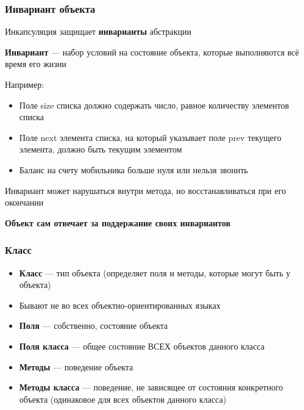 \documentclass[xetex,mathserif,serif]{beamer}
\begin{document}
	\begin{frame}
		\frametitle{Инвариант объекта}
		Инкапсуляция защищает \textbf{инварианты} абстракции
		
		\textbf{Инвариант} --- набор условий на состояние объекта, которые выполняются всё время его жизни

		Например:
		\begin{itemize}
			\item Поле size списка должно содержать число, равное количеству элементов списка
			\item Поле next элемента списка, на который указывает поле prev текущего элемента, должно быть текущим элементом
			\item Баланс на счету мобильника больше нуля или нельзя звонить
		\end{itemize}

		Инвариант может нарушаться внутри метода, но восстанавливаться при его окончании

		\textbf{Объект сам отвечает за поддержание своих инвариантов}
	\end{frame}

	\begin{frame}
		\frametitle{Класс}
		\begin{itemize}
			\item \textbf{Класс} --- тип объекта (определяет поля и методы, которые могут быть у объекта)
			\item Бывают не во всех объектно-ориентированных языках 
			\item \textbf{Поля} --- собственно, состояние объекта
			\item \textbf{Поля класса} --- общее состояние ВСЕХ объектов данного класса
			\item \textbf{Методы} --- поведение объекта
			\item \textbf{Методы класса} --- поведение, не зависящее от состояния конкретного объекта (одинаковое для всех объектов данного класса)
		\end{itemize}
	\end{frame}
\end{document}

